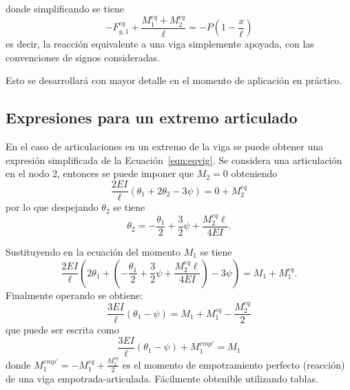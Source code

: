 donde simplificando se tiene
$$
- F_{y,1}^{eq} + \frac{M_1^{eq} + M_2^{eq}}{\ell} = -P \left( 1-\frac{x}{\ell} \right)
$$
es decir, la reacción equivalente a una viga simplemente apoyada, con las convenciones de signos consideradas.

%

Esto se desarrollará con mayor detalle en el momento de aplicación en práctico.


\subsection{Expresiones para un extremo articulado}

En el caso de articulaciones en un extremo de la viga se puede obtener una expresión simplificada de la Ecuación~\eqref{eqn:eqvig}. %
%
Se considera una articulación en el nodo 2, entonces se puede imponer que $M_2=0$ obteniendo  
%
\begin{equation}
\frac{2 EI}{\ell} \left( \theta_1 + 2  \theta_2 - 3 \psi  \right) = 0 + M_2^{eq}
\end{equation}
%
por lo que despejando $\theta_{2}$ se tiene
%
\begin{equation} \label{eqn:artictheta2}
\theta_2 = -\frac{\theta_1}{2} + \frac{3}{2} \psi + \frac{M_2^{eq} \ell }{4 EI}.
\end{equation}

Sustituyendo en la ecuación del momento $M_1$ se tiene
%
\begin{equation}
\frac{2 EI}{\ell} \left( 2 \theta_1 + \left( -\frac{\theta_1}{2} + \frac{3}{2} \psi + \frac{M_2^{eq} \ell }{4 EI} \right) - 3 \psi  \right) = M_1 + M_1^{eq}.
\end{equation}
%
Finalmente operando se obtiene:
%
\begin{equation} \label{eqn:ecmomart}
\frac{3 EI}{\ell} \left( \theta_1 - \psi  \right) = M_1 + M_1^{eq} - \frac{ M_2^{eq}}{2}
\end{equation}
%
que puede ser escrita como
%
\begin{equation}
\boxed{
\frac{3 EI}{\ell} \left( \theta_1 - \psi  \right) + M_1^{emp'} = M_1
}
\end{equation}
%
donde $M_1^{emp'} = - M_1^{eq} + \frac{ M_2^{eq}}{2} $ es el momento de empotramiento perfecto (reacción) de una viga empotrada-articulada. %
%
Fácilmente obtenible utilizando tablas.


